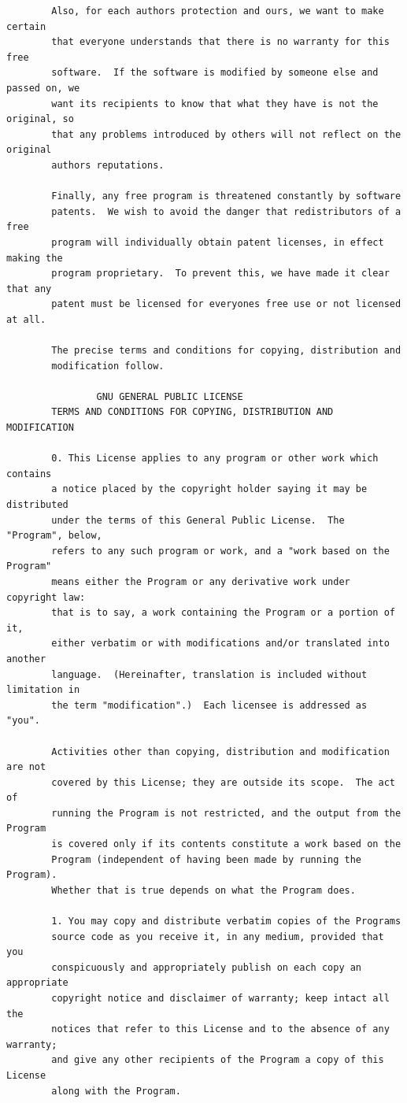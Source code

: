 \documentclass[a4paper,twoside,12pt]{book}
\begin{document}
{\begin{verbatim}
		Also, for each authors protection and ours, we want to make certain
		that everyone understands that there is no warranty for this free
		software.  If the software is modified by someone else and passed on, we
		want its recipients to know that what they have is not the original, so
		that any problems introduced by others will not reflect on the original
		authors reputations.

		Finally, any free program is threatened constantly by software
		patents.  We wish to avoid the danger that redistributors of a free
		program will individually obtain patent licenses, in effect making the
		program proprietary.  To prevent this, we have made it clear that any
		patent must be licensed for everyones free use or not licensed at all.

		The precise terms and conditions for copying, distribution and
		modification follow.

				GNU GENERAL PUBLIC LICENSE
		TERMS AND CONDITIONS FOR COPYING, DISTRIBUTION AND MODIFICATION

		0. This License applies to any program or other work which contains
		a notice placed by the copyright holder saying it may be distributed
		under the terms of this General Public License.  The "Program", below,
		refers to any such program or work, and a "work based on the Program"
		means either the Program or any derivative work under copyright law:
		that is to say, a work containing the Program or a portion of it,
		either verbatim or with modifications and/or translated into another
		language.  (Hereinafter, translation is included without limitation in
		the term "modification".)  Each licensee is addressed as "you".

		Activities other than copying, distribution and modification are not
		covered by this License; they are outside its scope.  The act of
		running the Program is not restricted, and the output from the Program
		is covered only if its contents constitute a work based on the
		Program (independent of having been made by running the Program).
		Whether that is true depends on what the Program does.

		1. You may copy and distribute verbatim copies of the Programs
		source code as you receive it, in any medium, provided that you
		conspicuously and appropriately publish on each copy an appropriate
		copyright notice and disclaimer of warranty; keep intact all the
		notices that refer to this License and to the absence of any warranty;
		and give any other recipients of the Program a copy of this License
		along with the Program.


\end{verbatim}}
\end{document}

